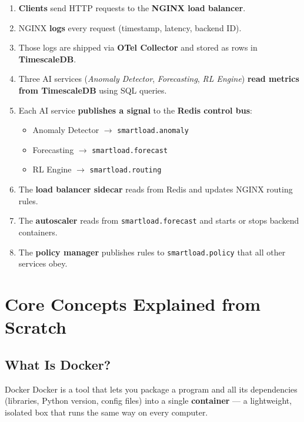 \documentclass[12pt, a4paper]{article}
\begin{document}
\begin{enumerate}
  \item \textbf{Clients} send HTTP requests to the \textbf{NGINX load balancer}.
  \item NGINX \textbf{logs} every request (timestamp, latency, backend ID).
  \item Those logs are shipped via \textbf{OTel Collector} and stored as rows in
        \textbf{TimescaleDB}.
  \item Three AI services (\textit{Anomaly Detector}, \textit{Forecasting},
        \textit{RL Engine}) \textbf{read metrics from TimescaleDB} using SQL
        queries.
  \item Each AI service \textbf{publishes a signal} to the \textbf{Redis control
        bus}:
        \begin{itemize}
          \item Anomaly Detector $\rightarrow$ \texttt{smartload.anomaly}
          \item Forecasting $\rightarrow$ \texttt{smartload.forecast}
          \item RL Engine $\rightarrow$ \texttt{smartload.routing}
        \end{itemize}
  \item The \textbf{load balancer sidecar} reads from Redis and updates NGINX
        routing rules.
  \item The \textbf{autoscaler} reads from \texttt{smartload.forecast} and
        starts or stops backend containers.
  \item The \textbf{policy manager} publishes rules to \texttt{smartload.policy}
        that all other services obey.
\end{enumerate}

\section{Core Concepts Explained from Scratch}

\subsection{What Is Docker?}

\begin{definitionbox}{Docker}
Docker is a tool that lets you package a program and all its dependencies
(libraries, Python version, config files) into a single \textbf{container}
--- a lightweight, isolated box that runs the same way on every computer.
\end{definitionbox}
\end{document}

